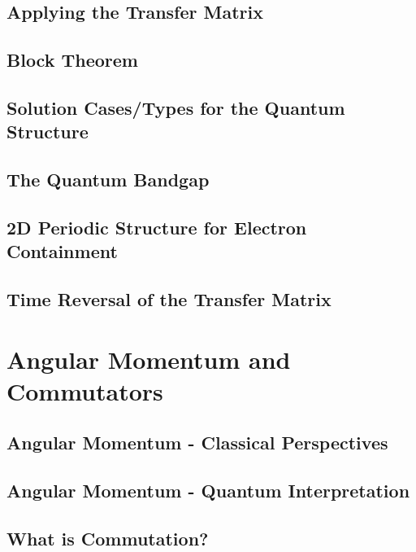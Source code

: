 \documentclass[colorlinks,11pt,a4paper,normalphoto,withhyper,ragged2e]{altareport}
\begin{document}
	
	\subsection{Applying the Transfer Matrix}
	
	
	\subsection{Block Theorem}
	
	
	\subsection{Solution Cases/Types for the Quantum Structure}
	
	
	\subsection{The Quantum Bandgap}
	
	
	\subsection{2D Periodic Structure for Electron Containment}
	
	
	\subsection{Time Reversal of the Transfer Matrix}
	
	
	\pagebreak
	
	
	
	
\section{Angular Momentum and Commutators}
	
	\subsection{Angular Momentum - Classical Perspectives}
	
	
	\subsection{Angular Momentum - Quantum Interpretation}
	
	
	\subsection{What is Commutation?}
	
\end{document}
